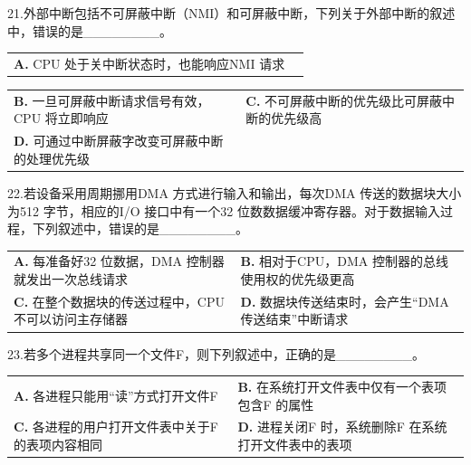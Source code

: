 \documentclass[UTF8,11pt]{ctexart}
\begin{document}
21.外部中断包括不可屏蔽中断（NMI）和可屏蔽中断，下列关于外部中断的叙述中，错误的是\_\_\_\_\_\_\_\_。


\begin{center}\begin{tabular}{>{\raggedright\arraybackslash}p{\dimexpr(\linewidth-4\tabcolsep)/2\relax}>{\raggedright\arraybackslash}p{\dimexpr(\linewidth-4\tabcolsep)/2\relax}}
\textbf{A.} CPU 处于关中断状态时，也能响应NMI 请求 & \\[.35em]\end{tabular}\end{center}

\begin{center}\begin{tabular}{>{\raggedright\arraybackslash}p{\dimexpr(\linewidth-4\tabcolsep)/2\relax}>{\raggedright\arraybackslash}p{\dimexpr(\linewidth-4\tabcolsep)/2\relax}}
\textbf{B.} 一旦可屏蔽中断请求信号有效，CPU 将立即响应 & \textbf{C.} 不可屏蔽中断的优先级比可屏蔽中断的优先级高\\[.35em]
\textbf{D.} 可通过中断屏蔽字改变可屏蔽中断的处理优先级 & \\[.35em]\end{tabular}\end{center}

22.若设备采用周期挪用DMA 方式进行输入和输出，每次DMA 传送的数据块大小为512 字节，相应的I/O 接口中有一个32 位数数据缓冲寄存器。对于数据输入过程，下列叙述中，错误的是\_\_\_\_\_\_\_\_。


\begin{center}\begin{tabular}{>{\raggedright\arraybackslash}p{\dimexpr(\linewidth-4\tabcolsep)/2\relax}>{\raggedright\arraybackslash}p{\dimexpr(\linewidth-4\tabcolsep)/2\relax}}
\textbf{A.} 每准备好32 位数据，DMA 控制器就发出一次总线请求 & \textbf{B.} 相对于CPU，DMA 控制器的总线使用权的优先级更高\\[.35em]
\textbf{C.} 在整个数据块的传送过程中，CPU 不可以访问主存储器 & \textbf{D.} 数据块传送结束时，会产生“DMA 传送结束”中断请求\\[.35em]\end{tabular}\end{center}

23.若多个进程共享同一个文件F，则下列叙述中，正确的是\_\_\_\_\_\_\_\_。


\begin{center}\begin{tabular}{>{\raggedright\arraybackslash}p{\dimexpr(\linewidth-4\tabcolsep)/2\relax}>{\raggedright\arraybackslash}p{\dimexpr(\linewidth-4\tabcolsep)/2\relax}}
\textbf{A.} 各进程只能用“读”方式打开文件F & \textbf{B.} 在系统打开文件表中仅有一个表项包含F 的属性\\[.35em]
\textbf{C.} 各进程的用户打开文件表中关于F 的表项内容相同 & \textbf{D.} 进程关闭F 时，系统删除F 在系统打开文件表中的表项\\[.35em]\end{tabular}\end{center}
\end{document}
